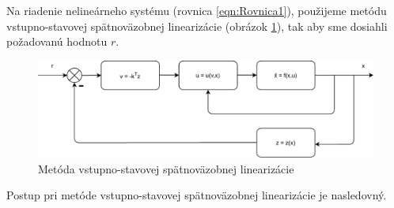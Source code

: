 \documentclass[../main.tex]{subfiles}
\begin{document}
Na riadenie nelineárneho systému (rovnica \ref{eqn:Rovnica1}), použijeme metódu vstupno-stavovej spätnoväzobnej linearizácie (obrázok \ref{fig:MetodaVS}), tak aby sme dosiahli požadovanú hodnotu $r$.
\begin{figure}[H]
	\begin{center}\includegraphics[scale=0.8]{MVSlin.pdf}\end{center}
	\caption{Metóda vstupno-stavovej spätnoväzobnej linearizácie}
	\label{fig:MetodaVS}
\end{figure}

Postup pri metóde vstupno-stavovej spätnoväzobnej linearizácie je nasledovný.
\end{document}
